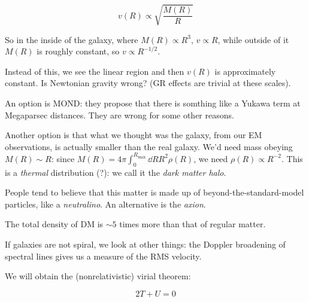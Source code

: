 \documentclass[main.tex]{subfiles}
\begin{document}
\begin{equation}
  v(R) \propto \sqrt{\frac{M(R)}{R}}
\end{equation}

So in the inside of the galaxy, where \(M(R) \propto R^3\), \(v \propto R\), while outside of it \(M(R)\) is roughly constant, so \(v \propto R^{-1/2}\).

Instead of this, we see the linear region and then \(v(R)\) is approximately constant. Is Newtonian gravity wrong? (GR effects are trivial at these scales).

An option is MOND: they propose that there is somthing like a Yukawa term at Megaparsec distances. They are wrong for some other reasons.

Another option is that what we thought was the galaxy, from our EM observations, is actually smaller than the real galaxy. We'd need mass obeying \(M (R) \sim R\): since \(M(R) = 4 \pi \int_0^{R_{\text{max}}} \dd{R} R^2 \rho(R)\), we need \(\rho(R) \propto R^{-2}\). This is a \emph{thermal} distribution (?): we call it the \emph{dark matter halo}.

People tend to believe that this matter is made up of beyond-the-standard-model particles, like a \emph{neutralino}.
An alternative is the \emph{axion}.

The total density of DM is \(\sim 5\) times more than that of regular matter.

If galaxies are not spiral, we look at other things: the Doppler broadening of spectral lines gives us a measure of the RMS velocity.

We will obtain the (nonrelativistic) virial theorem:

\begin{equation}
  2T + U = 0
\end{equation}
\end{document}
